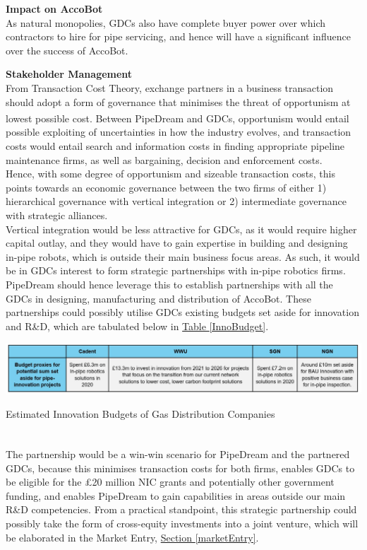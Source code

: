 \documentclass[11pt]{article}		%
\newcommand{\supercite}[1]{\textsuperscript{\cite{#1}}}		%
\newcommand{\tableref}[1]{\hyperref[#1]{Table \ref*{#1}}}     %
\newcommand{\sectref}[1]{\hyperref[#1]{Section \ref*{#1}}}     %
\begin{document}
        \textbf{Impact on AccoBot}
        \\
        As natural monopolies, GDCs also have complete buyer power over which contractors to hire for pipe servicing, and hence will have a significant influence over the success of AccoBot. 
        
        \textbf{Stakeholder Management}
        \\
	    From Transaction Cost Theory, exchange partners in a business transaction should adopt a form of governance that minimises the threat of opportunism at lowest possible cost\supercite{transaction}. Between PipeDream and GDCs, opportunism would entail possible exploiting of uncertainties in how the industry evolves, and transaction costs would entail search and information costs in finding appropriate pipeline maintenance firms, as well as bargaining, decision and enforcement costs. 
         \\ 
         \hspace*{3ex}Hence, with some degree of opportunism and sizeable transaction costs, this points towards an economic governance between the two firms of either 1) hierarchical governance with vertical integration or 2) intermediate governance with strategic alliances. 
         \\ 
         \hspace*{3ex}Vertical integration would be less attractive for GDCs, as it would require higher capital outlay, and they would have to gain expertise in building and designing in-pipe robots, which is outside their main business focus areas. As such, it would be in GDCs interest to form strategic partnerships with in-pipe robotics firms. 
         \\ 
         \hspace*{3ex}PipeDream should hence leverage this to establish partnerships with all the GDCs in designing, manufacturing and distribution of AccoBot. These partnerships could possibly utilise GDCs existing budgets set aside for innovation and R\&D, which are tabulated below in \tableref{InnoBudget}. 
        \begin{table}[h]
					\centering
					\includegraphics[width=\textwidth]{InnoBudget.jpg}
					\caption{Estimated Innovation Budgets of Gas Distribution Companies}
					\label{InnoBudget}
				\end{table}
		\\
        \hspace*{3ex}The partnership would be a win-win scenario\supercite{winwin} for PipeDream and the partnered GDCs, because this minimises transaction costs for both firms, enables GDCs to be eligible for the £20 million NIC grants and potentially other government funding, and enables PipeDream to gain capabilities in areas outside our main R\&D competencies. From a practical standpoint, this strategic partnership could possibly take the form of cross-equity investments into a joint venture, which will be elaborated in the Market Entry, \sectref{marketEntry}.
		
\end{document}
